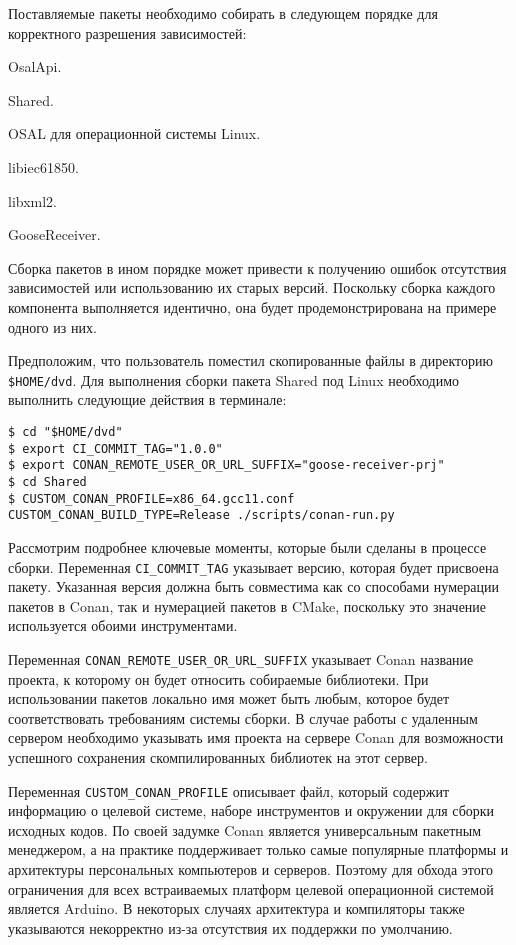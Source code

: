 Поставляемые пакеты необходимо собирать в следующем порядке для корректного
разрешения зависимостей:
\begin{enumerate_num}
    \item OsalApi.
    \item Shared.
    \item OSAL для операционной системы Linux.
    \item libiec61850.
    \item libxml2.
    \item GooseReceiver.
\end{enumerate_num}

Сборка пакетов в ином порядке может привести к получению ошибок
отсутствия зависимостей или использованию их старых версий.
Поскольку сборка каждого компонента выполняется идентично, она будет
продемонстрирована на примере одного из них.

Предположим, что пользователь поместил скопированные файлы в директорию
\lstinline{$HOME/dvd}. Для выполнения сборки пакета Shared
под Linux необходимо выполнить следующие действия в терминале:

\begin{lstlisting}
$ cd "$HOME/dvd"
$ export CI_COMMIT_TAG="1.0.0"
$ export CONAN_REMOTE_USER_OR_URL_SUFFIX="goose-receiver-prj"
$ cd Shared
$ CUSTOM_CONAN_PROFILE=x86_64.gcc11.conf CUSTOM_CONAN_BUILD_TYPE=Release ./scripts/conan-run.py
\end{lstlisting}

Рассмотрим подробнее ключевые моменты, которые были сделаны в процессе сборки.
Переменная \lstinline{CI_COMMIT_TAG} указывает версию, которая будет присвоена
пакету. Указанная версия должна быть совместима как со способами нумерации
пакетов в Conan, так и нумерацией пакетов в CMake, поскольку это значение
используется обоими инструментами.

Переменная \lstinline{CONAN_REMOTE_USER_OR_URL_SUFFIX} указывает
Conan название проекта, к которому он будет относить собираемые библиотеки.
При использовании пакетов локально имя может быть любым, которое будет
соответствовать требованиям системы сборки. В случае работы с удаленным
сервером необходимо указывать имя проекта на сервере Conan для
возможности успешного сохранения скомпилированных библиотек на этот сервер.

Переменная \lstinline{CUSTOM_CONAN_PROFILE} описывает файл, который
содержит информацию о
целевой системе, наборе инструментов и окружении для сборки исходных кодов.
По своей задумке Conan является универсальным пакетным менеджером,
а на практике поддерживает только самые популярные платформы и архитектуры
персональных компьютеров и серверов. Поэтому для обхода этого ограничения
для всех встраиваемых платформ целевой операционной системой является Arduino.
В некоторых случаях архитектура и компиляторы также указываются некорректно из-за
отсутствия их поддержки по умолчанию.

